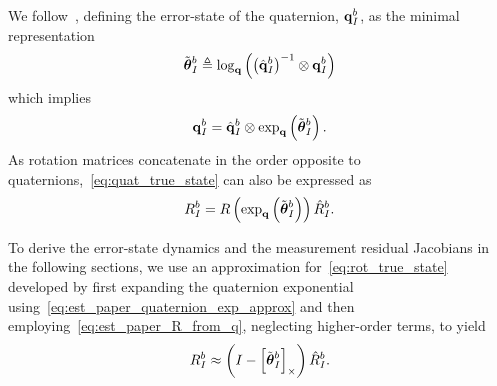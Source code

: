 We follow~\cite{koch2017relative}, defining the error-state of the quaternion,
$\boldsymbol{\mathrm{q}}_I^b$,
as the minimal representation
\begin{equation}
  \tilde{\vect{\theta}}_I^b \triangleq \log_{\q} \left( \left( \hat{\q}_I^b \right)^{-1}
  \otimes \q_I^b \right)
  \label{eq:quat_error_state}
\end{equation}
which implies
\begin{equation}
  \q_I^b  = \hat{\q}_I^b \otimes \exp_{\q} \left( \tilde{\vect{\theta}}_I^b
  \right).
  \label{eq:quat_true_state}
\end{equation}
As rotation matrices concatenate in the order opposite to
quaternions,~\eqref{eq:quat_true_state} can also be expressed as
\begin{equation}
  R_I^b  = R \left( \exp_{\q} \left( \tilde{\vect{\theta}}_I^b \right) \right)
  \hat{R}_I^b.
  \label{eq:rot_true_state}
\end{equation}

To derive the error-state dynamics and the measurement residual Jacobians in the
following sections, we
use an approximation for~\eqref{eq:rot_true_state} developed by first expanding
the
quaternion exponential using~\eqref{eq:est_paper_quaternion_exp_approx} and then
employing~\eqref{eq:est_paper_R_from_q}, neglecting higher-order terms, to yield
\begin{equation}
  R_I^b  \approx 
  \left( I - \skewmat{\tilde{\vect{\theta}}_I^b} \right)
  \hat{R}_I^b.
  \label{eq:est_paper_Rapprox}
\end{equation}




